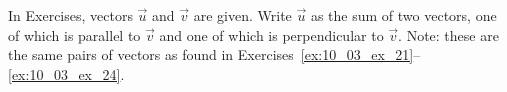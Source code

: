 \begin{exerciseset}{In Exercises}{, vectors $\vec u$ and $\vec v$ are given. Write $\vec u$ as the sum of two vectors, one of which is parallel to $\vec v$ and one of which is perpendicular to $\vec v$. Note: these are the same pairs of vectors as found in Exercises~\ref{ex:10_03_ex_21}--\ref{ex:10_03_ex_24}.}







\end{exerciseset}
